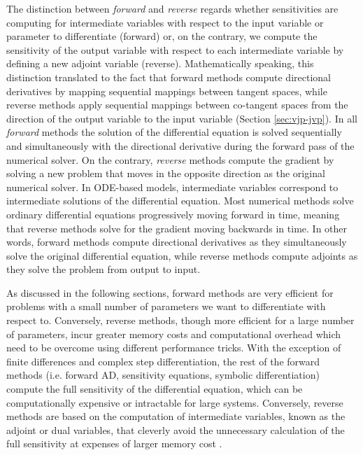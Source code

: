 The distinction between \textit{forward} and \textit{reverse} regards whether sensitivities are computing for intermediate variables with respect to the input variable or parameter to differentiate (forward) or, on the contrary, we compute the sensitivity of the output variable with respect to each intermediate variable by defining a new adjoint variable (reverse). 
Mathematically speaking, this distinction translated to the fact that forward methods compute directional derivatives by mapping sequential mappings between tangent spaces, while reverse methods apply sequential mappings between co-tangent spaces from the direction of the output variable to the input variable (Section \ref{sec:vjp-jvp}).   
In all \textit{forward} methods the solution of the differential equation is solved sequentially and simultaneously with the directional derivative during the forward pass of the numerical solver. 
On the contrary, \textit{reverse} methods compute the gradient by solving a new problem that moves in the opposite direction as the original numerical solver.
In ODE-based models, intermediate variables correspond to intermediate solutions of the differential equation.
Most numerical methods solve ordinary differential equations progressively moving forward in time, meaning that reverse methods solve for the gradient moving backwards in time. 
In other words, forward methods compute directional derivatives as they simultaneously solve the original differential equation, while reverse methods compute adjoints as they solve the problem from output to input.

As discussed in the following sections, forward methods are very efficient for problems with a small number of parameters we want to differentiate with respect to. 
Conversely, reverse methods, though more efficient for a large number of parameters, incur greater memory costs and computational overhead which need to be overcome using different performance tricks. 
With the exception of finite differences and complex step differentiation, the rest of the forward methods (i.e. forward AD, sensitivity equations, symbolic differentiation) compute the full sensitivity of the differential equation, which can be computationally expensive or intractable for large systems. 
Conversely, reverse methods are based on the computation of intermediate variables, known as the adjoint or dual variables, that cleverly avoid the unnecessary calculation of the full sensitivity at expenses of larger memory cost \cite{Givoli_2021}. 

